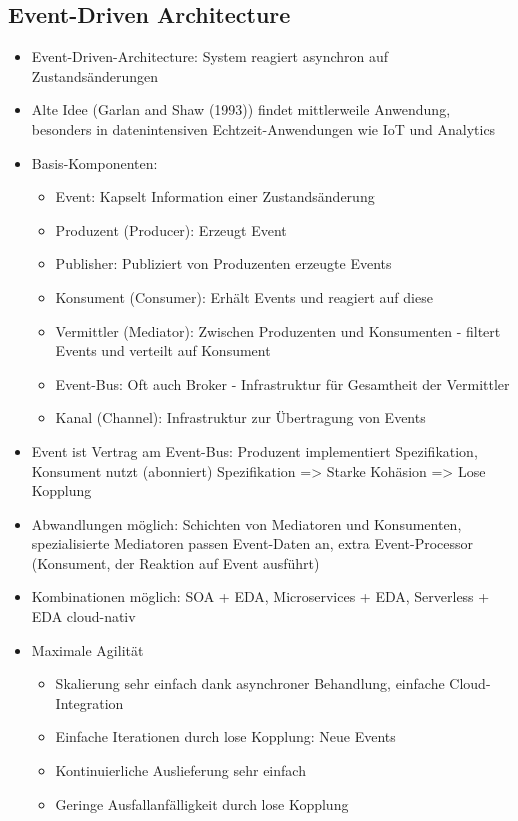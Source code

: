 \documentclass[acmtog]{acmart}
\begin{document}
\subsection{Event-Driven Architecture}
\begin{itemize}
  \item Event-Driven-Architecture: System reagiert asynchron auf Zustandsänderungen \cite{eda}
  \item Alte Idee (Garlan and Shaw (1993)) findet mittlerweile Anwendung, besonders in datenintensiven Echtzeit-Anwendungen wie IoT und Analytics
  \item Basis-Komponenten:
  \begin{itemize}
    \item Event: Kapselt Information einer Zustandsänderung
    \item Produzent (Producer): Erzeugt Event
    \item Publisher: Publiziert von Produzenten erzeugte Events
    \item Konsument (Consumer): Erhält Events und reagiert auf diese
    \item Vermittler (Mediator): Zwischen Produzenten und Konsumenten - filtert Events und verteilt auf Konsument
    \item Event-Bus: Oft auch Broker - Infrastruktur für Gesamtheit der Vermittler
    \item Kanal (Channel): Infrastruktur zur Übertragung von Events
  \end{itemize}
  \item Event ist Vertrag am Event-Bus: Produzent implementiert Spezifikation, Konsument nutzt (abonniert) Spezifikation => Starke Kohäsion => Lose Kopplung
  \item Abwandlungen möglich: Schichten von Mediatoren und Konsumenten, spezialisierte Mediatoren passen Event-Daten an, extra Event-Processor (Konsument, der Reaktion auf Event ausführt)
  \item Kombinationen möglich: SOA + EDA, Microservices + EDA, Serverless + EDA cloud-nativ
  \item Maximale Agilität
  \begin{itemize}
    \item Skalierung sehr einfach dank asynchroner Behandlung, einfache Cloud-Integration
    \item Einfache Iterationen durch lose Kopplung: Neue Events
    \item Kontinuierliche Auslieferung sehr einfach
    \item Geringe Ausfallanfälligkeit durch lose Kopplung

\end{itemize}
\end{itemize}
\end{document}
